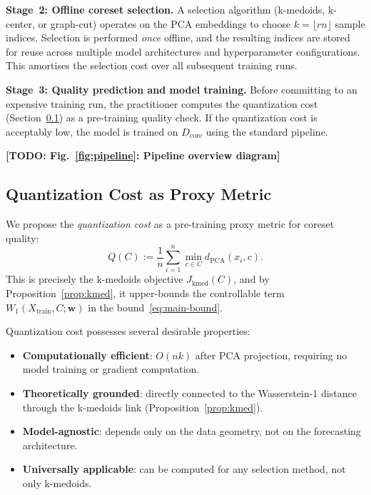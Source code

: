 \documentclass[journal]{IEEEtran}
\newcommand{\Wone}{W_1}
\newcommand{\Xtrain}{X_{\mathrm{train}}}
\newcommand{\Dcore}{D_{\mathrm{core}}}
\newcommand{\Jkmed}{J_{\mathrm{kmed}}}
\newcommand{\todo}[1]{{\color{red}\textbf{[TODO: #1]}}}
\begin{document}
\textbf{Stage~2: Offline coreset selection.}
A selection algorithm (k-medoids, k-center, or graph-cut) operates
on the PCA embeddings to choose $k = \lfloor rn \rfloor$ sample
indices.
Selection is performed \emph{once} offline, and the resulting
indices are stored for reuse across multiple model architectures
and hyperparameter configurations.
This amortises the selection cost over all subsequent training runs.

\textbf{Stage~3: Quality prediction and model training.}
Before committing to an expensive training run, the practitioner
computes the quantization cost (Section~\ref{sec:quant-metric})
as a pre-training quality check.
If the quantization cost is acceptably low, the model is trained
on $\Dcore$ using the standard pipeline.

\todo{Fig.~\ref{fig:pipeline}: Pipeline overview diagram}

\subsection{Quantization Cost as Proxy Metric}
\label{sec:quant-metric}

We propose the \emph{quantization cost} as a pre-training proxy
metric for coreset quality:
\begin{equation}\label{eq:quant}
  Q(C) := \frac{1}{n} \sum_{i=1}^{n}
    \min_{c \in C} d_{\mathrm{PCA}}(x_i, c).
\end{equation}
This is precisely the k-medoids objective $\Jkmed(C)$, and by
Proposition~\ref{prop:kmed}, it upper-bounds the controllable term
$\Wone(\Xtrain, C; \mathbf{w})$ in the bound~\eqref{eq:main-bound}.

Quantization cost possesses several desirable properties:
\begin{itemize}
  \item \textbf{Computationally efficient}: $O(nk)$ after PCA
    projection, requiring no model training or gradient computation.
  \item \textbf{Theoretically grounded}: directly connected to the
    Wasserstein-1 distance through the k-medoids link
    (Proposition~\ref{prop:kmed}).
  \item \textbf{Model-agnostic}: depends only on the data geometry,
    not on the forecasting architecture.
  \item \textbf{Universally applicable}: can be computed for any
    selection method, not only k-medoids.
\end{itemize}
\end{document}
